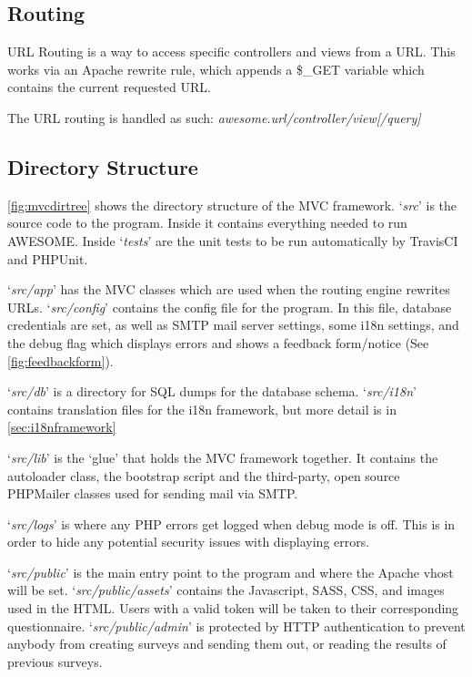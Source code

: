 	\subsection{Routing}
	
	URL Routing is a way to access specific controllers and views from a URL.
	This works via an Apache rewrite rule, which appends a \$\_GET variable which contains the current requested URL.
	
	The URL routing is handled as such: \textit{awesome.url/controller/view[/query]}
	
	\subsection{Directory Structure}
	
	\autoref{fig:mvcdirtree} shows the directory structure of the \ac{MVC} framework. `\textit{src}' is the source code to the program. Inside it contains everything needed to run \ac{AWESOME}.
	Inside `\textit{tests}' are the unit tests to be run automatically by TravisCI and PHPUnit.
	
	`\textit{src/app}' has the MVC classes which are used when the routing engine rewrites URLs.
	`\textit{src/config}' contains the config file for the program.
	In this file, database credentials are set, as well as SMTP mail server settings, some \ac{i18n} settings, and the debug flag which displays errors and shows a feedback form/notice (See \autoref{fig:feedbackform}).
	
	`\textit{src/db}' is a directory for \ac{SQL} dumps for the database schema.
	`\textit{src/i18n}' contains translation files for the \ac{i18n} framework, but more detail is in \autoref{sec:i18nframework}
	
	`\textit{src/lib}' is the `glue' that holds the MVC framework together.
	It contains the autoloader class, the bootstrap script and the third-party, open source PHPMailer\cite{phpmailer} classes used for sending mail via SMTP.
	
	`\textit{src/logs}' is where any PHP errors get logged when debug mode is off. This is in order to hide any potential security issues with displaying errors.
	
	`\textit{src/public}' is the main entry point to the program and where the Apache vhost will be set.
	`\textit{src/public/assets}' contains the Javascript, SASS, CSS, and images used in the HTML.
	Users with a valid token will be taken to their corresponding questionnaire.
	`\textit{src/public/admin}' is protected by HTTP authentication to prevent anybody from creating surveys and sending them out, or reading the results of previous surveys.
	
